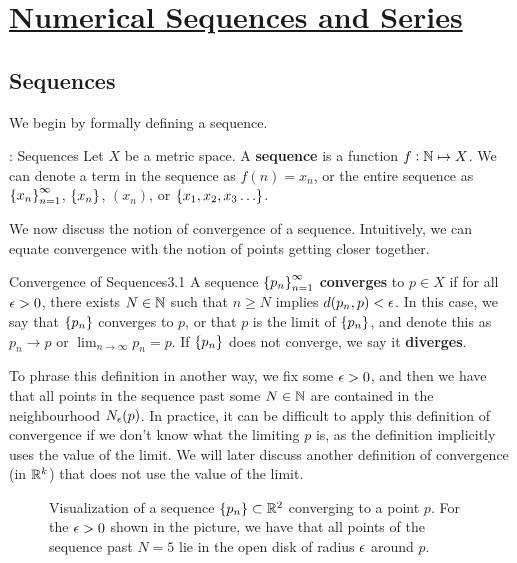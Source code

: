 \newpage
\section[Numerical Sequences and Series]{\hyperlink{toc}{Numerical Sequences and Series}}
\subsection{Sequences}
We begin by formally defining a sequence.
\begin{ndef}{: Sequences}{}
    Let $X$ be a metric space. A \textbf{sequence} is a function $f: \mathbb{N} \mapsto X$. We can denote a term in the sequence as $f(n) = x_n$, or the entire sequence as $\set{x_n}_{n=1}^\infty$, $\set{x_n}$, $(x_n)$, or $\set{x_1, x_2, x_3 \ldots}$. 
\end{ndef}
\noindent We now discuss the notion of convergence of a sequence. Intuitively, we can equate convergence with the notion of points getting closer together.
\begin{definition}{Convergence of Sequences}{3.1}
    A sequence $\set{p_n}_{n=1}^\infty$ \textbf{converges} to $p \in X$ if for all $\epsilon > 0$, there exists $N \in \mathbb{N}$ such that $n \geq N$ implies $d(p_n, p) < \epsilon$. In this case, we say that $\set{p_n}$ converges to $p$, or that $p$ is the limit of $\set{p_n}$, and denote this as $p_n \rightarrow p$ or $\lim_{n \rightarrow \infty} p_n = p$. If $\set{p_n}$ does not converge, we say it \textbf{diverges}.
\end{definition}
\noindent To phrase this definition in another way, we fix some $\epsilon > 0$, and then we have that all points in the sequence past some $N \in \mathbb{N}$ are contained in the neighbourhood $N_\epsilon(p)$. In practice, it can be difficult to apply this definition of convergence if we don't know what the limiting $p$ is, as the definition implicitly uses the value of the limit. We will later discuss another definition of convergence (in $\mathbb{R}^k$) that does not use the value of the limit.
\begin{figure}[htbp]
    \centering
    \caption{Visualization of a sequence $\set{p_n} \subset \mathbb{R}^2$ converging to a point $p$. For the $\epsilon > 0$ shown in the picture, we have that all points of the sequence past $N = 5$ lie in the open disk of radius $\epsilon$ around $p$.}
    \label{fig15}
\end{figure}

